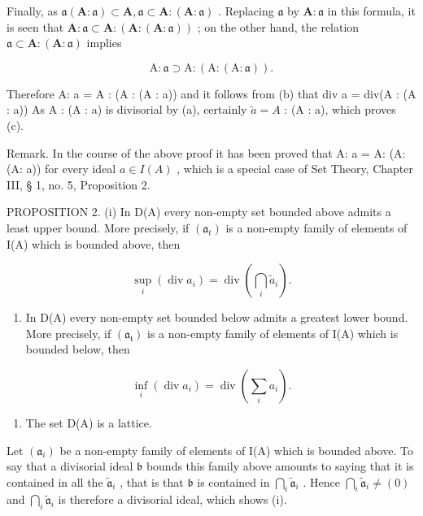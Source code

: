 Finally, as \(\mathfrak{a}(\mathbf{A}:\mathfrak{a})\subset \mathbf{A},\mathfrak{a}\subset \mathbf{A}:(\mathbf{A}:\mathfrak{a})\) . Replacing \(\mathfrak{a}\) by \(\mathbf{A}:\mathfrak{a}\) in this formula, it is seen that \(\mathbf{A}:\mathfrak{a}\subset \mathbf{A}:(\mathbf{A}:(\mathbf{A}:\mathfrak{a}))\) ; on the other hand, the relation \(\mathfrak{a}\subset \mathbf{A}:(\mathbf{A}:\mathfrak{a})\) implies

\[
\mathrm{A}: \mathfrak {a} \supset \mathrm{A}: (\mathrm{A}: (\mathrm{A}: \mathfrak {a})).
\]

Therefore A: a = A : (A : (A : a)) and it follows from (b) that div a = div(A : (A : a)) As A : (A : a) is divisorial by (a), certainly \(\tilde{a} = A\) : (A : a), which proves (c).

Remark. In the course of the above proof it has been proved that A: a = A: (A: (A: a)) for every ideal \(a \in I(A)\) , which is a special case of Set Theory, Chapter III, § 1, no. 5, Proposition 2.

PROPOSITION 2. (i) In D(A) every non-empty set bounded above admits a least upper bound. More precisely, if \((\mathfrak{a}_t)\) is a non-empty family of elements of I(A) which is bounded above, then

\[
\sup _ {i} (\operatorname{div} a _ {i}) = \operatorname{div} \left(\bigcap_ {i} \tilde {a} _ {i}\right).
\]

\begin{enumerate}
\def\labelenumi{(\roman{enumi})}
\setcounter{enumi}{1}
\tightlist
\item
  In D(A) every non-empty set bounded below admits a greatest lower bound. More precisely, if \((\mathfrak{a}_{\mathfrak{t}})\) is a non-empty family of elements of I(A) which is bounded below, then
\end{enumerate}

\[
\inf _ {i} (\operatorname{div} a _ {i}) = \operatorname{div} \left(\sum_ {i} a _ {i}\right).
\]

\begin{enumerate}
\def\labelenumi{(\roman{enumi})}
\setcounter{enumi}{2}
\tightlist
\item
  The set D(A) is a lattice.
\end{enumerate}

Let \((\mathfrak{a}_i)\) be a non-empty family of elements of I(A) which is bounded above. To say that a divisorial ideal \(\mathfrak{b}\) bounds this family above amounts to saying that it is contained in all the \(\tilde{\mathfrak{a}}_i\) , that is that \(\mathfrak{b}\) is contained in \(\bigcap_{i} \tilde{\mathfrak{a}}_i\) . Hence \(\bigcap_{i} \tilde{\mathfrak{a}}_i \neq (0)\) and \(\bigcap_{i} \tilde{\mathfrak{a}}_i\) is therefore a divisorial ideal, which shows (i).

